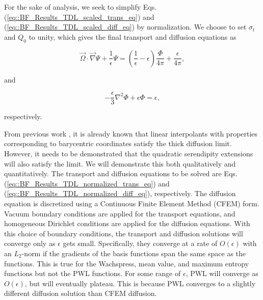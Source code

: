 For the sake of analysis, we seek to simplify Eqs. (\ref{eq::BF_Results_TDL_scaled_trans_eq}) and (\ref{eq::BF_Results_TDL_scaled_diff_eq}) by normalization. We choose to set $\sigma_t$ and $Q_0$ to unity, which gives the final transport and diffusion equations as  

\begin{equation}
\label{eq::BF_Results_TDL_normalized_trans_eq}
\vec{\Omega} \cdot \vec{\nabla} \Psi + \frac{1}{\epsilon} \Psi =  \left( \frac{1}{\epsilon} - \epsilon   \right)  \frac{\Phi}{4 \pi} +  \frac{\epsilon}{4 \pi} ,
\end{equation}

\noindent and

\begin{equation}
\label{eq::BF_Results_TDL_normalized_diff_eq}
-\frac{\epsilon}{3} {\nabla}^2 \Phi + \epsilon  \Phi =  \epsilon ,
\end{equation}

\noindent respectively.

From previous work \cite{adams2001dfem}, it is already known that linear interpolants with properties corresponding to barycentric coordinates satisfy the thick diffusion limit. However, it needs to be demonstrated that the quadratic serendipity extensions will also satisfy the limit. We will demonstrate this both qualitatively and quantitatively. The transport and diffusion equations to be solved are Eqs. (\ref{eq::BF_Results_TDL_normalized_trans_eq}) and (\ref{eq::BF_Results_TDL_normalized_diff_eq}), respectively. The diffusion equation is discretized using a Continuous Finite Element Method (CFEM) form. Vacuum boundary conditions are applied for the transport equations, and homogeneous Dirichlet conditions are applied for the diffusion equations. With this choice of boundary conditions, the transport and diffusion solutions will converge only as $\epsilon$ gets small. Specifically, they converge at a rate of $O(\epsilon)$ with an $L_2$-norm if the gradients of the basis functions span the same space as the functions. This is true for the Wachspress, mean value, and maximum entropy functions but not the PWL functions. For some range of $\epsilon$, PWL will converge as $O(\epsilon)$, but will eventually plateau. This is because PWL converges to a slightly different diffusion solution than CFEM diffusion.

